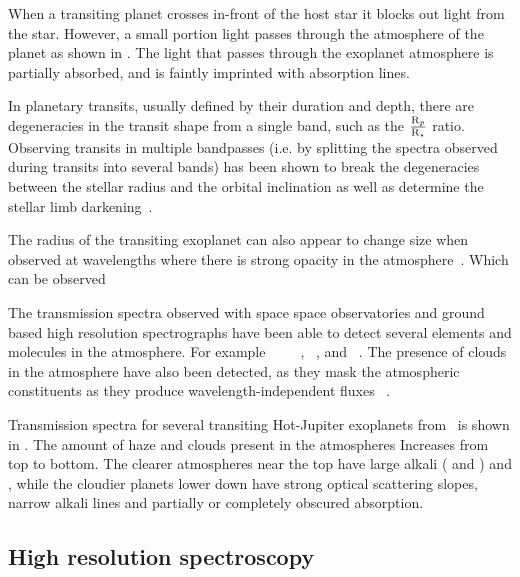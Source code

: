 When a transiting planet crosses in-front of the host star it blocks out light from the star.
However, a small portion light passes through the atmosphere of the planet as shown in .
The light that passes through the exoplanet atmosphere is partially absorbed, and is faintly imprinted with absorption lines.


In planetary transits, usually defined by their duration and depth, there are degeneracies in the transit shape from a single band, such as the \(\frac{\textrm{R}_{p}}{\textrm{R}_{\star}}\) ratio.
Observing transits in multiple bandpasses (i.e. by splitting the spectra observed during transits into several bands)  has been shown to break the degeneracies between the stellar radius and the orbital inclination as well as determine the stellar limb darkening~\citep{jha_multicolor_2000, knutson_using_2007}.

The radius of the transiting exoplanet can also appear to change size when observed at wavelengths where there is strong opacity in the atmosphere~\citep[e.g.][]{burrows_radii_2000, seager_theoretical_2000}.
Which can be observed

The transmission spectra observed with space space observatories and ground based high resolution spectrographs have been able to detect several elements and molecules in the atmosphere.
For example ~\citep{charbonneau_detection_2002, redfield_sodium_2008, wyttenbach_spectrally_2015, nikolov_vlt_2016} ~\cite{tinetti_water_2007, brogi_carbon_2014} ~\citep{brogi_carbon_2014, snellen_mass_2018}, ~\citep{redfield_extrasolar_2010},  and ~\citep{hoeijmakers_atomic_2018}.
The presence of clouds in the atmosphere have also been detected, as they mask the atmospheric constituents as they produce wavelength-independent fluxes ~\citep[e.g.][]{barman_clouds_2011, kreidberg_clouds_2014, sing_continuum_2016}.

Transmission spectra for several transiting Hot-Jupiter exoplanets from~\citet{sing_continuum_2016} is shown in .
The amount of haze and clouds present in the atmospheres Increases from top to bottom.
The clearer atmospheres near the top have large alkali ( and ) and , while the cloudier planets lower down have strong optical scattering slopes, narrow alkali lines and partially or completely obscured  absorption.


\subsection{High resolution spectroscopy}

